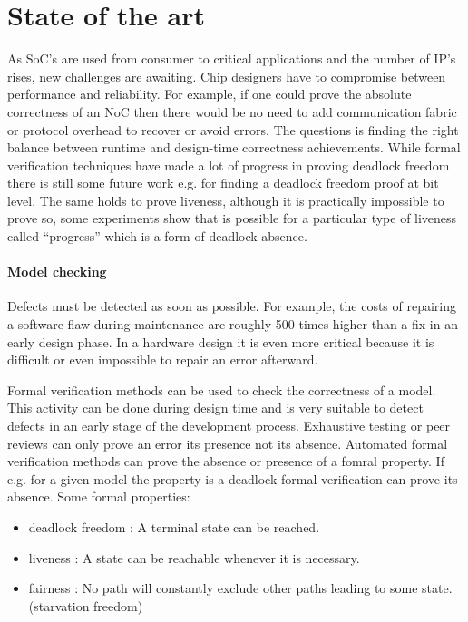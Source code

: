 \section{State of the art}

As SoC's are used from consumer to critical applications and the number of IP's
rises, new challenges are awaiting. Chip designers have to compromise between
performance and reliability. For example, if one could prove the absolute
correctness of an NoC then there would be no need to add communication fabric or
protocol overhead to recover or avoid errors. The questions is finding the right
balance between runtime and design-time correctness achievements. While formal
verification techniques have made a lot of progress in proving deadlock freedom
there is still some future work e.g. for finding a deadlock freedom proof at bit
level. The same holds to prove liveness, although it is practically impossible to
prove so, some experiments show that is possible for a particular type of
liveness called ``progress'' which is a form of deadlock absence.
\cite{Ray:2012:SPV:2492708.2492936,itp}


\paragraph{Model checking}\cite{baier2008principles}

Defects must be detected as soon as possible. For example, the costs of repairing
a software flaw during maintenance are roughly 500 times higher than a fix in an
early design phase. In a hardware design it is even more critical because it is
difficult or even impossible to repair an error afterward.

Formal verification methods can be used to check the correctness of a model.
This activity can be done during design time and is very suitable to detect
defects in an early stage of the development process. Exhaustive testing or peer
reviews can only prove an error its presence not its absence. Automated formal
verification methods can prove the absence or presence of a fomral property. If
e.g. for a given model the property is a deadlock formal verification can prove
its absence.
Some formal properties:

\begin{itemize}
\item deadlock freedom : A terminal state can be reached.
\item liveness : A state can be reachable whenever it is necessary.
\item fairness : No path will constantly exclude other paths leading to some
state. (starvation freedom)
\end{itemize} 

